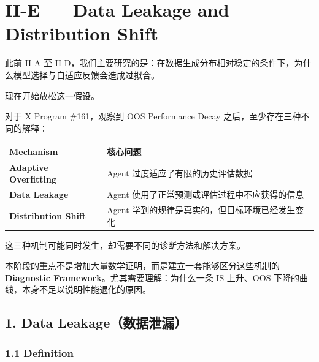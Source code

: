 \hypertarget{part-2-23-0001-ii-e-data-leakage-and-distribution-shift}{%
\section{II-E --- Data Leakage and Distribution Shift}\label{part-2-23-0001-ii-e-data-leakage-and-distribution-shift}}

此前 II-A 至 II-D，我们主要研究的是：在数据生成分布相对稳定的条件下，为什么模型选择与自适应反馈会造成过拟合。

现在开始放松这一假设。

对于 X Program \#161，观察到 OOS Performance Decay 之后，至少存在三种不同的解释：

\begin{readertable}
\begin{longtable}[]{@{}
  >{\raggedright\arraybackslash}p{}
  >{\raggedright\arraybackslash}p{}@{}}
\toprule
Mechanism & 核心问题 \\
\midrule
\endhead
\textbf{Adaptive Overfitting} & Agent 过度适应了有限的历史评估数据 \\
\textbf{Data Leakage} & Agent 使用了正常预测或评估过程中不应获得的信息 \\
\textbf{Distribution Shift} & Agent 学到的规律是真实的，但目标环境已经发生变化 \\
\bottomrule
\end{longtable}
\end{readertable}

这三种机制可能同时发生，却需要不同的诊断方法和解决方案。

本阶段的重点不是增加大量数学证明，而是建立一套能够区分这些机制的 \textbf{Diagnostic Framework}。尤其需要理解：为什么一条 IS 上升、OOS 下降的曲线，本身不足以说明性能退化的原因。

\hypertarget{part-2-23-0001-data-leakageux6570ux636eux6cc4ux6f0f}{%
\subsection{1. Data Leakage（数据泄漏）}\label{part-2-23-0001-data-leakageux6570ux636eux6cc4ux6f0f}}

\hypertarget{part-2-23-0001-definition}{%
\subsubsection{1.1 Definition}\label{part-2-23-0001-definition}}

